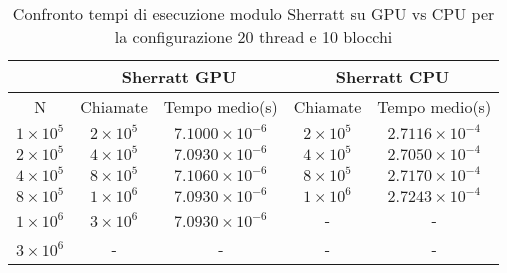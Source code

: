 \begin{table}[ht!]
    \begin{center}
        \renewcommand{\arraystretch}{1.5}
        \begin{adjustbox}{width=.65\textwidth}
            \begin{tabular}{ |c|c|c|c|c| }
                \hline
                \multicolumn{1}{|c}{} & \multicolumn{2}{|c}{Sherratt GPU} & \multicolumn{2}{|c|}{Sherratt CPU} \\
                \hline
                 N & Chiamate & Tempo medio(s) & Chiamate & Tempo medio(s) \\
                \hline 
                $1 \times 10^5$ & $2 \times 10^{5}$ & $7.1000 \times 10^{-6}$  & $2 \times 10^{5}$ & $2.7116 \times 10^{-4}$ \\ 
                \hline 
                $2 \times 10^5$ & $4 \times 10^{5}$ & $7.0930 \times 10^{-6}$  & $4 \times 10^{5}$ & $2.7050 \times 10^{-4}$ \\ 
                \hline 
                $4 \times 10^5$ & $8 \times 10^{5}$ & $7.1060 \times 10^{-6}$  & $8 \times 10^{5}$ & $2.7170 \times 10^{-4}$ \\ 
                \hline 
                $8 \times 10^5$ & $1 \times 10^{6}$ & $7.0930 \times 10^{-6}$  & $1 \times 10^{6}$ & $2.7243 \times 10^{-4}$ \\ 
                \hline 
                $1 \times 10^6$ & $3 \times 10^{6}$ & $7.0930 \times 10^{-6}$  & - & - \\ 
                \hline
                 $3 \times 10^6$ & - & - & - & -\\ 
                \hline 
            \end{tabular}
        \end{adjustbox}
    \end{center}
    \caption{Confronto tempi di esecuzione modulo Sherratt su GPU vs CPU per la configurazione 20 thread e 10 blocchi}
    \label{tab:sherratt_kernel_table_20x10}
\end{table}

